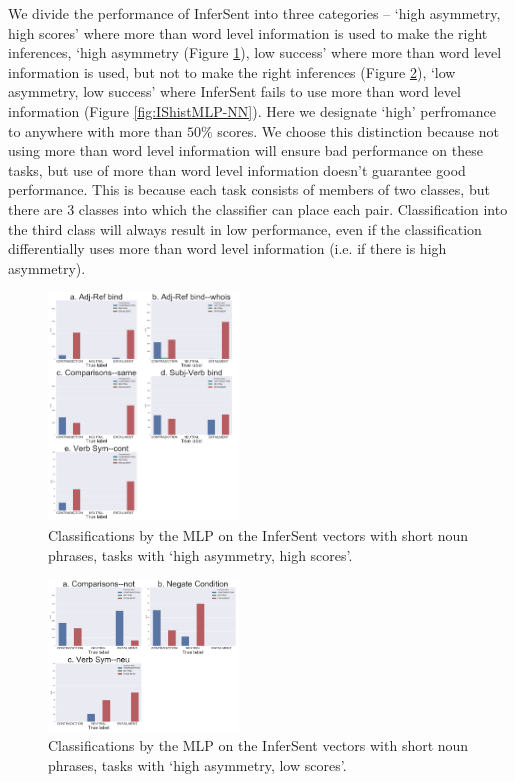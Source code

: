 \documentclass[10pt,letterpaper]{article}
\begin{document}
We divide the performance of InferSent into three categories – `high asymmetry, high scores' where more than word level information is used to make the right inferences, `high asymmetry (Figure \ref{fig:IShistMLP-PP}), low success' where more than word level information is used, but not to make the right inferences (Figure \ref{fig:IShistMLP-NP}), `low asymmetry, low success' where InferSent fails to use more than word level information (Figure \ref{fig:IShistMLP-NN}). Here we designate `high' perfromance to anywhere with more than $50\%$ scores. We choose this distinction because not using more than word level information will ensure bad performance on these tasks, but use of more than word level information doesn't guarantee good performance. This is because each task consists of members of two classes, but there are 3 classes into which the classifier can place each pair. Classification into the third class will always result in low performance, even if the classification differentially uses more than word level information (i.e. if there is high asymmetry).

\begin{figure}[ht!]
\centering
\includegraphics[width=0.45\textwidth]{PPShortHistsInferSentMLP.png}
\caption{Classifications by the MLP on the InferSent vectors with short noun phrases, tasks with `high asymmetry, high scores'.}
\label{fig:IShistMLP-PP}
\end{figure}


\begin{figure}[ht!]
\centering
\includegraphics[width=0.45\textwidth]{NPShortHistsInferSentMLP.png}
\caption{Classifications by the MLP on the InferSent vectors with short noun phrases, tasks with `high asymmetry, low scores'.}
\label{fig:IShistMLP-NP}
\end{figure}
\end{document}
